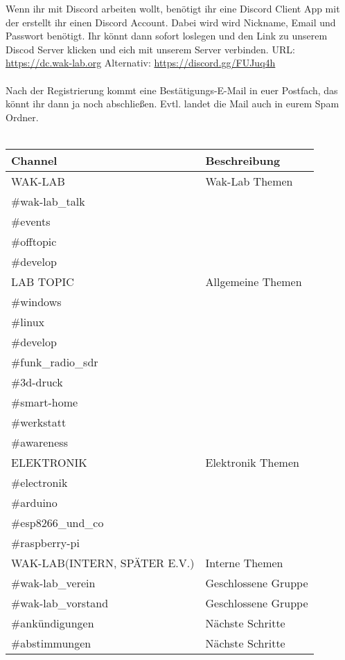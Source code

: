 Wenn ihr mit Discord arbeiten wollt, benötigt ihr eine Discord Client App mit der erstellt ihr einen Discord Account. Dabei wird wird Nickname, Email und Passwort benötigt. Ihr könnt dann sofort loslegen und den Link zu unserem Discod Server klicken und eich mit unserem Server verbinden. URL: \url{https://dc.wak-lab.org} Alternativ: \url{https://discord.gg/FUJuq4h}\\
\ \\
Nach der Registrierung kommt eine Bestätigungs-E-Mail in euer Postfach, das könnt ihr dann ja noch abschließen. Evtl. landet die Mail auch in eurem Spam Ordner. \\
\ \\
\begin{raggedright}
\begin{tabular}{|p{}|p{}|}
\hline
\textbf{Channel} & \textbf{Beschreibung}\\
\hline
WAK-LAB & Wak-Lab Themen\\
\cline{1-1}
\#wak-lab\_talk & \\
\cline{1-1}
\#events & \\
\cline{1-1}
\#offtopic & \\
\cline{1-1}
\#develop & \\
\hline
LAB TOPIC & Allgemeine Themen\\
\cline{1-1}
\#windows & \\
\cline{1-1}
\#linux & \\
\cline{1-1}
\#develop & \\
\cline{1-1}
\#funk\_radio\_sdr & \\
\cline{1-1}
\#3d-druck & \\
\cline{1-1}
\#smart-home & \\
\cline{1-1}
\#werkstatt & \\
\cline{1-1}
\#awareness & \\
\hline
ELEKTRONIK & Elektronik Themen\\
\cline{1-1}
\#electronik & \\
\cline{1-1}
\#arduino & \\
\cline{1-1}
\#esp8266\_und\_co & \\
\cline{1-1}
\#raspberry-pi & \\
\hline
WAK-LAB(INTERN, SPÄTER E.V.) & Interne Themen\\
\cline{1-1}
\#wak-lab\_verein & Geschlossene Gruppe\\
\cline{1-1}
\#wak-lab\_vorstand & Geschlossene Gruppe\\
\cline{1-1}
\#ankündigungen & Nächste Schritte\\
\cline{1-1}
\#abstimmungen & Nächste Schritte\\
\hline
\end{tabular}
\label{tab:Channels}
\end{raggedright}


